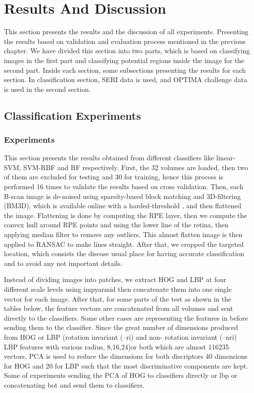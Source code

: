 \chapter{Results And Discussion} \label{chap:results}

This section presents the results and the discussion of all experiments.
Presenting the results based on validation and evaluation process mentioned in the previous chapter.
We have divided this section into two parts, which is based on classifying images in the first part and classifying potential regions inside the image for the second part.
Inside each section, some subsections presenting the results for each section.
In classification section, SERI data is used, and OPTIMA challenge data is used in the second section.

\section{Classification Experiments}
\subsection{Experiments}
This section presents the results obtained from different classifiers like linear-SVM, SVM-RBF and RF respectively.
First, the 32 volumes are loaded, then two of them are excluded for testing and 30 for training, hence this process is performed 16 times to validate the results based on cross validation.
Then, each B-scan image is de-noised using sparsity-based block matching and 3D-filtering (BM3D), which is available online with a harded-threshold , and then flattened the image.
Flattening is done by computing the RPE layer, then we compute the convex hull around RPE points and using the lower line of the retina, then applying median filter to remove any outliers.
This almost flatten image is then applied to RANSAC to make lines straight.
After that, we cropped the targeted location, which consists the disease usual place for having accurate classification and to avoid any not important details.

Instead of dividing images into patches, we extract HOG and LBP at four different scale levels using impyarmid then concatenate them into one single vector for each image.
After that, for some parts of the test as shown in the tables below, the feature vectors are concatenated from all volumes and sent directly to the classifiers.
Some other cases are representing the features in before sending them to the classifier.
Since the great number of dimensions produced from HOG or LBP (rotation invariant (–ri) and non- rotation invariant (–nri) LBP features with various radius, {8,16,24})or both which are almost 116235 vectors, PCA is used to reduce the dimensions for both discriptors 40 dimensions for HOG and 20 for LBP such that the most discriminative components are kept.
Some of experiments sending the PCA of HOG to classifiers directly or lbp or concatenating bot and send them to classifiers.

